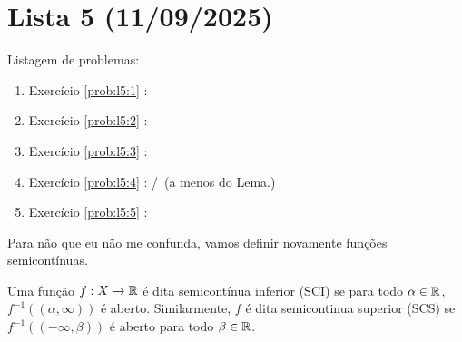 \clearpage
\section{Lista 5 (11/09/2025)}

Listagem de problemas:
\begin{enumerate}
    \item Exercício \ref{prob:l5:1} : \checkmark
    \item Exercício \ref{prob:l5:2} : \checkmark
    \item Exercício \ref{prob:l5:3} : \checkmark
    \item Exercício \ref{prob:l5:4} : \Frowny/\checkmark\, (a menos do Lema.)
    \item Exercício \ref{prob:l5:5} : \checkmark
\end{enumerate}

\begin{problem}
    \label{prob:l5:1}
\end{problem}
Para não que eu não me confunda, vamos definir novamente funções semicontínuas.
\begin{definition}
    Uma função $f: X \rightarrow \mathbb{R}$ é dita semicontínua inferior (SCI) se para todo $\alpha \in \mathbb{R}$,
    $f^{-1}( (\alpha, \infty) )$ é aberto. Similarmente, $f$ é dita semicontinua superior (SCS)
    se $f^{-1}((-\infty, \beta))$ é aberto para todo $\beta \in \mathbb{R}$.
\end{definition}

